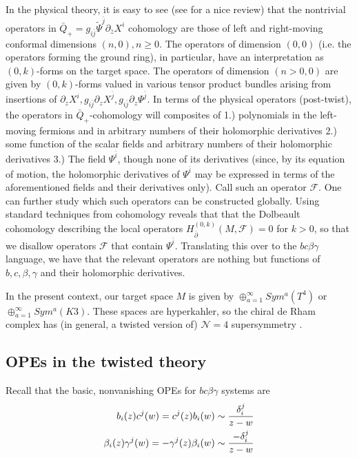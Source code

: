 \documentclass[11pt]{amsart}
\theoremstyle{thm}
\numberwithin{equation}{subsection}
\theoremstyle{def}
\theoremstyle{rem}
\begin{document}
In the physical theory, it is easy to see (see \cite{Tan} for a nice review) that the nontrivial operators in $\bar{Q}_+ = g_{i \bar{j}}\tilde{\Psi}^{\bar{j}} \partial_{\bar{z}}X^i$ cohomology are those of left and right-moving conformal dimensions $(n, 0), n \geq 0$. The operators of dimension $(0, 0)$ (i.e. the operators forming the ground ring), in particular, have an interpretation as $(0,k)$-forms on the target space. The operators of dimension $(n > 0, 0)$ are given by $(0, k)$-forms valued in various tensor product bundles arising from insertions of $\partial_z X^i, g_{i \bar{j}}\partial_z X^{\bar{j}}, g_{i \bar{j}}\partial_z \Psi^{\bar{j}}$. In terms of the physical operators (post-twist), the operators in $\bar{Q}_+$-cohomology will composites of 1.) polynomials in the left-moving fermions and in arbitrary numbers of their holomorphic derivatives 2.) some function of the scalar fields and arbitrary numbers of their holomorphic derivatives 3.) The field $\Psi^{\bar{i}}$, though none of its derivatives (since, by its equation of motion, the holomorphic derivatives of $\Psi^{\bar{i}}$ may be expressed in terms of the aforementioned fields and their derivatives only). Call such an operator $\mathcal{F}$. One can further study which such operators can be constructed globally. Using standard techniques from cohomology reveals that that the Dolbeault cohomology describing the local operators $H_{\bar{\partial}}^{(0,k)}(M, \mathcal{F})=0$ for $k>0$, so that we disallow operators $\mathcal{F}$ that contain $\Psi^{\bar{i}}$. Translating this over to the $bc\beta\gamma$ language, we have that the relevant operators are nothing but functions of $b, c, \beta, \gamma$ and their holomorphic derivatives.

In the present context, our target space $M$ is given by $\oplus_{a=1}^{\infty} Sym^a (T^4)$ or $\oplus_{a=1}^{\infty} Sym^a(K3)$. These spaces are hyperkahler, so the chiral de Rham complex has  (in general, a twisted version of) $\mathcal{N}=4$ supersymmetry \cite{Heluanietal}.

\subsection{OPEs in the twisted theory}

Recall that the basic, nonvanishing OPEs for $bc\beta\gamma$ systems are
\begin{align*}
b_i(z)c^j(w) = c^j(z)b_i(w) &\sim {\delta^{j}_i \over z - w} \\
\beta_i(z)\gamma^j(w) = -\gamma^j(z)\beta_i(w) &\sim {-\delta^{j}_i \over z - w}
\end{align*}
\end{document}
